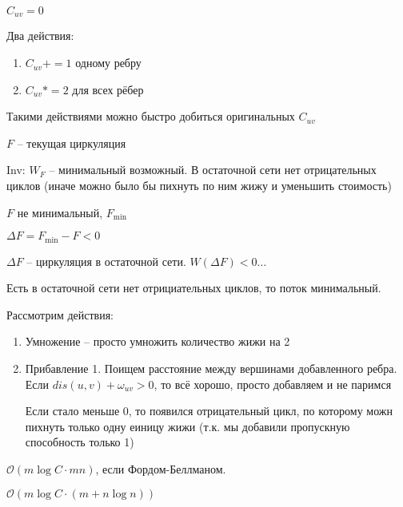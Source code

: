 $C_{uv} = 0$

Два действия:
 \begin{enumerate}
     \item $C_{uv} += 1$ одному ребру
     \item  $C_{uv} *= 2$ для всех рёбер
\end{enumerate}

\begin{statement}
    Такими действиями можно быстро добиться оригинальных $C_{uv}$
\end{statement}

$F$ -- текущая циркуляция

Inv:  $W_F$ -- минимальный возможный. В остаточной сети нет отрицательных циклов (иначе можно было бы пихнуть по ним жижу и уменьшить стоимость)

$F$ не минимальный,  $F_{\min}$

$\Delta F = F_{\min} - F < 0$

$\Delta F$ -- циркуляция в остаточной сети.  $W(\Delta F) <0 \ldots$

Есть в остаточной сети нет отрициательных циклов, то поток минимальный.

Рассмотрим действия:
\begin{enumerate}
    \item Умножение -- просто умножить количество жижи на 2
    \item Прибавление 1. Поищем расстояние между вершинами добавленного ребра. Если $dis(u,v) + \omega_{uv}>0$, то всё хорошо, просто добавляем и не паримся

        Если стало меньше 0, то появился отрицательный цикл, по которому можн пихнуть только одну еиницу жижи (т.к. мы добавили пропускную способность только 1)
\end{enumerate}         

$\mathcal O\left( m\log C\cdot mn \right) $, если Фордом-Беллманом.

$\mathcal O\left( m\log C \cdot \left( m + n\log n \right)  \right) $
